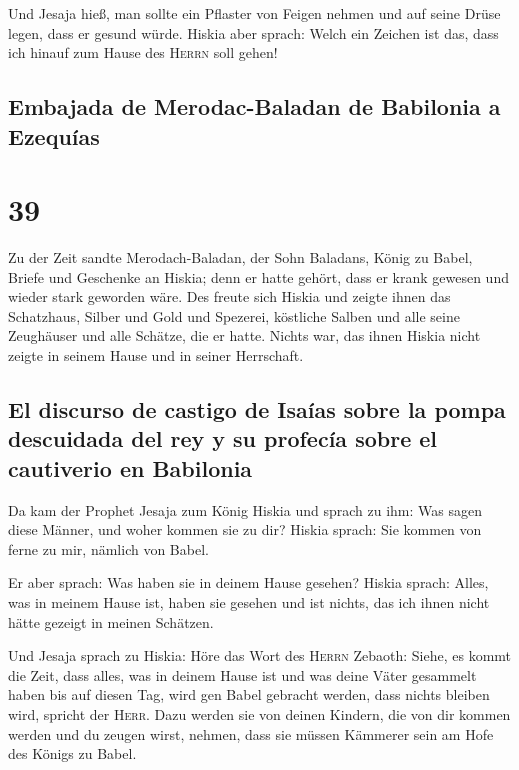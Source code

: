  Und Jesaja hieß, man sollte ein Pflaster von Feigen
nehmen und auf seine Drüse legen, dass er gesund würde. 
Hiskia aber sprach: Welch ein Zeichen ist das, dass ich hinauf zum Hause
des \textsc{Herrn} soll gehen!

\hypertarget{embajada-de-merodac-baladan-de-babilonia-a-ezequuxedas}{%
\subsection{Embajada de Merodac-Baladan de Babilonia a
Ezequías}\label{embajada-de-merodac-baladan-de-babilonia-a-ezequuxedas}}

\hypertarget{section-38}{%
\section{39}\label{section-38}}

 Zu der Zeit sandte Merodach-Baladan, der Sohn Baladans,
König zu Babel, Briefe und Geschenke an Hiskia; denn er hatte gehört,
dass er krank gewesen und wieder stark geworden wäre.  Des
freute sich Hiskia und zeigte ihnen das Schatzhaus, Silber und Gold und
Spezerei, köstliche Salben und alle seine Zeughäuser und alle Schätze,
die er hatte. Nichts war, das ihnen Hiskia nicht zeigte in seinem Hause
und in seiner Herrschaft.

\hypertarget{el-discurso-de-castigo-de-isauxedas-sobre-la-pompa-descuidada-del-rey-y-su-profecuxeda-sobre-el-cautiverio-en-babilonia}{%
\subsection{El discurso de castigo de Isaías sobre la pompa descuidada
del rey y su profecía sobre el cautiverio en
Babilonia}\label{el-discurso-de-castigo-de-isauxedas-sobre-la-pompa-descuidada-del-rey-y-su-profecuxeda-sobre-el-cautiverio-en-babilonia}}

 Da kam der Prophet Jesaja zum König Hiskia und sprach zu
ihm: Was sagen diese Männer, und woher kommen sie zu dir? Hiskia sprach:
Sie kommen von ferne zu mir, nämlich von Babel.

 Er aber sprach: Was haben sie in deinem Hause gesehen?
Hiskia sprach: Alles, was in meinem Hause ist, haben sie gesehen und ist
nichts, das ich ihnen nicht hätte gezeigt in meinen Schätzen.

 Und Jesaja sprach zu Hiskia: Höre das Wort des
\textsc{Herrn} Zebaoth:  Siehe, es kommt die Zeit, dass
alles, was in deinem Hause ist und was deine Väter gesammelt haben bis
auf diesen Tag, wird gen Babel gebracht werden, dass nichts bleiben
wird, spricht der \textsc{Herr}.  Dazu werden sie von
deinen Kindern, die von dir kommen werden und du zeugen wirst, nehmen,
dass sie müssen Kämmerer sein am Hofe des Königs zu Babel.

